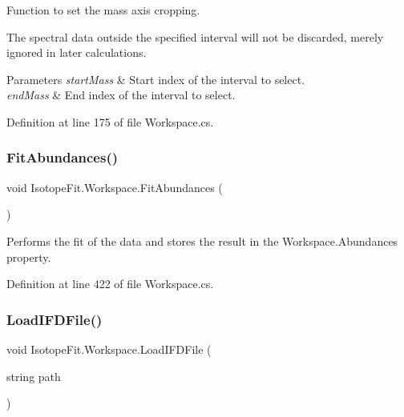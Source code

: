Function to set the mass axis cropping. 

The spectral data outside the specified interval will not be discarded, merely ignored in later calculations.


\begin{DoxyParams}{Parameters}
{\em start\+Mass} & Start index of the interval to select.\\
\hline
{\em end\+Mass} & End index of the interval to select.\\
\hline
\end{DoxyParams}


Definition at line 175 of file Workspace.\+cs.

\mbox{\label{class_isotope_fit_1_1_workspace_a40fa9b2c0b5d31feae1093d08b1aad52}} 
\subsubsection{\texorpdfstring{Fit\+Abundances()}{FitAbundances()}}
{\footnotesize\ttfamily void Isotope\+Fit.\+Workspace.\+Fit\+Abundances (\begin{DoxyParamCaption}{ }\end{DoxyParamCaption})}



Performs the fit of the data and stores the result in the Workspace.\+Abundances property. 



Definition at line 422 of file Workspace.\+cs.

\mbox{\label{class_isotope_fit_1_1_workspace_a55061c1f05d3e02d2d591fe6211d2f1f}} 
\subsubsection{\texorpdfstring{Load\+I\+F\+D\+File()}{LoadIFDFile()}}
{\footnotesize\ttfamily void Isotope\+Fit.\+Workspace.\+Load\+I\+F\+D\+File (\begin{DoxyParamCaption}\item[{string}]{path }\end{DoxyParamCaption})}



